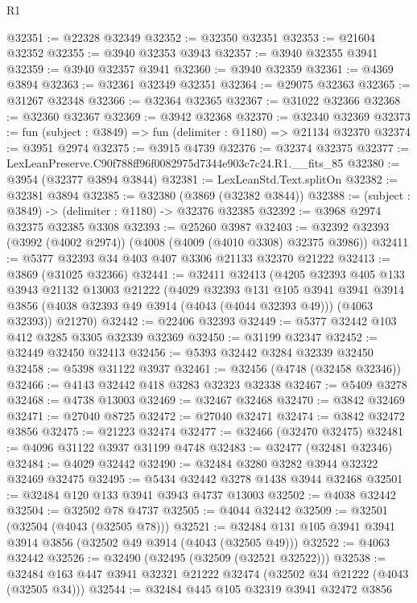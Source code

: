 \begin{lexlean}{R1}
\begin{coremodule}
@32351 := @22328 @32349
@32352 := @32350 @32351
@32353 := @21604 @32352
@32355 := @3940 @32353 @3943
@32357 := @3940 @32355 @3941
@32359 := @3940 @32357 @3941
@32360 := @3940 @32359
@32361 := @4369 @3894
@32363 := @32361 @32349 @32351
@32364 := @29075 @32363
@32365 := @31267 @32348
@32366 := @32364 @32365
@32367 := @31022 @32366
@32368 := @32360 @32367
@32369 := @3942 @32368
@32370 := @32340 @32369
@32373 := fun (subject : @3849) => fun (delimiter : @1180) => @21134 @32370
@32374 := @3951 @2974
@32375 := @3915 @4739
@32376 := @32374 @32375
@32377 := LexLeanPreserve.C90f788ff96f0082975d7344e903c7c24.R1.__fits_85
@32380 := @3954 (@32377 @3894 @3844)
@32381 := LexLeanStd.Text.splitOn
@32382 := @32381 @3894
@32385 := @32380 (@3869 (@32382 @3844))
@32388 := (subject : @3849) -> (delimiter : @1180) -> @32376 @32385
@32392 := @3968 @2974 @32375 @32385 @3308
@32393 := @25260 @3987
@32403 := @32392 @32393 (@3992 (@4002 @2974)) (@4008 (@4009 (@4010 @3308) @32375 @3986))
@32411 := @5377 @32393 @34 @403 @407 @3306 @21133 @32370 @21222
@32413 := @3869 (@31025 @32366)
@32441 := @32411
    @32413
    (@4205
      @32393
      @405
      @133
      @3943
      @21132
      @13003
      @21222
      (@4029
        @32393
        @131
        @105
        @3941
        @3941
        @3914
        @3856
        (@4038 @32393 @49 @3914 (@4043 (@4044 @32393 @49)))
        (@4063 @32393))
      @21270)
@32442 := @22406 @32393
@32449 := @5377 @32442 @103 @412 @3285 @3305 @32339 @32369
@32450 := @31199 @32347
@32452 := @32449 @32450 @32413
@32456 := @5393 @32442 @3284 @32339 @32450
@32458 := @5398 @31122 @3937
@32461 := @32456 (@4748 (@32458 @32346))
@32466 := @4143 @32442 @418 @3283 @32323 @32338
@32467 := @5409 @3278
@32468 := @4738 @13003
@32469 := @32467 @32468
@32470 := @3842 @32469
@32471 := @27040 @8725
@32472 := @27040 @32471
@32474 := @3842 @32472 @3856
@32475 := @21223 @32474
@32477 := @32466 (@32470 @32475)
@32481 := @4096 @31122 @3937 @31199 @4748
@32483 := @32477 (@32481 @32346)
@32484 := @4029 @32442
@32490 := @32484 @3280 @3282 @3944 @32322 @32469 @32475
@32495 := @5434 @32442 @3278 @1438 @3944 @32468
@32501 := @32484 @120 @133 @3941 @3943 @4737 @13003
@32502 := @4038 @32442
@32504 := @32502 @78 @4737
@32505 := @4044 @32442
@32509 := @32501 (@32504 (@4043 (@32505 @78)))
@32521 := @32484 @131 @105 @3941 @3941 @3914 @3856 (@32502 @49 @3914 (@4043 (@32505 @49)))
@32522 := @4063 @32442
@32526 := @32490 (@32495 (@32509 (@32521 @32522)))
@32538 := @32484 @163 @447 @3941 @32321 @21222 @32474 (@32502 @34 @21222 (@4043 (@32505 @34)))
@32544 := @32484 @445 @105 @32319 @3941 @32472 @3856

\end{coremodule}
\end{lexlean}
